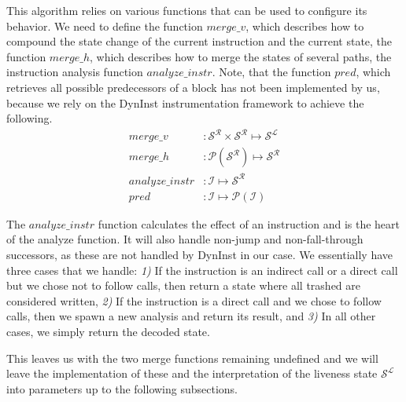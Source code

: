 This algorithm relies on various functions that can be used to configure its behavior. We need to define the 
function $merge\_v$, which describes how to compound the state change of the current instruction and the current state, 
the function $merge\_h$, which describes how to merge the states of several paths, the instruction analysis function
$analyze\_instr$. Note, that the function $pred$, which retrieves all possible predecessors of a block has not been implemented by us, because we rely on the DynInst instrumentation 
framework to achieve the following.
\vspace{-.1cm}
\begin{subequations}
\label{eq:livenesscustom}
\begin{align}
merge\_v &: \mathcal{S}^\mathcal{R} \times \mathcal{S}^\mathcal{R} \mapsto \mathcal{S}^\mathcal{L}\\
merge\_h &: \mathcal{P}(\mathcal{S}^\mathcal{R}) \mapsto \mathcal{S}^\mathcal{R}\\
analyze\_instr &: \mathcal {I} \mapsto \mathcal{S}^\mathcal{R} \\
pred &: \mathcal{I} \mapsto \mathcal{P}(\mathcal{I})
\end{align}
\end{subequations}
\vspace{-.6cm}

The $analyze\_instr$ function calculates the effect of an instruction and is the heart of the analyze function. It will also 
handle non-jump and non-fall-through successors, as these are not handled by DynInst in our case. We essentially have three cases that we handle:
\textit{1)} If the instruction is an indirect call or a direct call but we chose not to follow calls, then return a state where all trashed are considered written,
\textit{2)} If the instruction is a direct call and we chose to follow calls, then we spawn a new analysis and return its result, and
\textit{3)} In all other cases, we simply return the decoded state.

This leaves us with the two merge functions remaining undefined and we will leave the implementation of these and the interpretation of the 
liveness state $\mathcal{S}^\mathcal{L}$ into parameters up to the following subsections.


